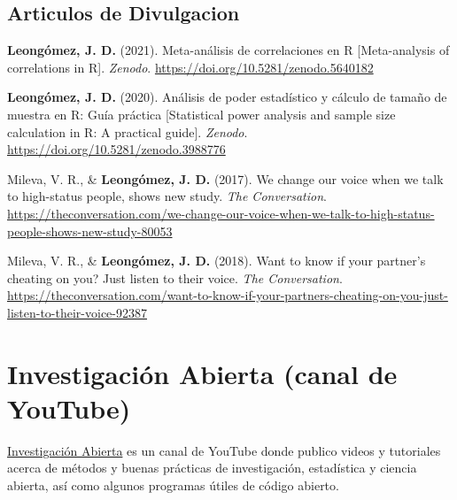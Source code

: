 \documentclass[11pt,a4paper,]{awesome-cv}
\begin{document}
\endgroup

\hypertarget{section-2}{%
\subsection{\texorpdfstring{\textbf{Articulos de Divulgacion}}{}}\label{section-2}}

\begingroup
\setlength{\parindent}{-0.5in}
\setlength{\leftskip}{0.5in}

\hypertarget{refs_divulgation}{}
\leavevmode{}%
\textbf{Leongómez, J. D.} (2021). {Meta-análisis de correlaciones en R
{[}Meta-analysis of correlations in R{]}}. \emph{Zenodo}.
\url{https://doi.org/10.5281/zenodo.5640182}

\leavevmode{}%
\textbf{Leongómez, J. D.} (2020). {Análisis de poder estadístico y
cálculo de tamaño de muestra en R: Guía práctica {[}Statistical power
analysis and sample size calculation in R: A practical guide{]}}.
\emph{Zenodo}. \url{https://doi.org/10.5281/zenodo.3988776}

\leavevmode{}%
Mileva, V. R., \& \textbf{Leongómez, J. D.} (2017). {We change our voice
when we talk to high-status people, shows new study}. \emph{The
Conversation}.
\url{https://theconversation.com/we-change-our-voice-when-we-talk-to-high-status-people-shows-new-study-80053}

\leavevmode{}%
Mileva, V. R., \& \textbf{Leongómez, J. D.} (2018). {Want to know if
your partner's cheating on you? Just listen to their voice}. \emph{The
Conversation}.
\url{https://theconversation.com/want-to-know-if-your-partners-cheating-on-you-just-listen-to-their-voice-92387}

\endgroup

\hypertarget{investigaciuxf3n-abierta-canal-de-youtube}{%
\section{Investigación Abierta (canal de
YouTube)}\label{investigaciuxf3n-abierta-canal-de-youtube}}

\href{https://www.youtube.com/c/InvestigaciónAbierta}{\textcolor{red}{\faYoutubePlay}
Investigación Abierta} es un canal de YouTube donde publico videos y
tutoriales acerca de métodos y buenas prácticas de investigación,
estadística y ciencia abierta, así como algunos programas útiles de
código abierto.
\end{document}
